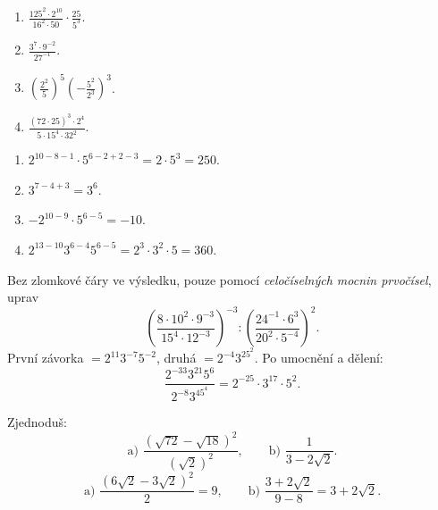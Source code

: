 \documentclass[11pt,a4paper]{article}
\begin{document}
\begin{zadaniReseniBox}[title={Samostatná práce 2},breakable=false]
\begin{enumerate}[label=\alph*)]
\item $\displaystyle\frac{125^2\cdot2^{10}}{16^2\cdot50}\cdot\frac{25}{5^3}$.
\item $\displaystyle\frac{3^7\cdot9^{-2}}{27^{-1}}$.
\item $\displaystyle\left(\frac{2^2}{5}\right)^5\left(-\frac{5^2}{2^3}\right)^3$.
\item $\displaystyle\frac{(72\cdot25)^3\cdot2^4}{5\cdot15^4\cdot32^2}$.
\end{enumerate}
\tcblower
\begin{enumerate}[label=\alph*)]
\item $2^{10-8-1}\cdot5^{6-2+2-3}=2\cdot5^3=\boxed{250}$.
\item $3^{7-4+3}=\boxed{3^6}$.
\item $-2^{10-9}\cdot5^{6-5}=\boxed{-10}$.
\item $2^{13-10}3^{6-4}5^{6-5}=2^3\cdot3^2\cdot5=\boxed{360}$.
\end{enumerate}
\end{zadaniReseniBox}

\begin{zadaniReseniBox}[title={Rozšíření 2},breakable=false]
Bez zlomkové čáry ve výsledku, pouze pomocí \emph{celočíselných mocnin prvočísel},
uprav
\[
\left(\frac{8\cdot10^2\cdot9^{-3}}{15^4\cdot12^{-3}}\right)^{-3}
:\left(\frac{24^{-1}\cdot6^3}{20^2\cdot5^{-4}}\right)^2.
\]
\tcblower
První závorka $=2^{11}3^{-7}5^{-2}$, druhá $=2^{-4}3^25^2$.
Po umocnění a dělení:
\[
\frac{2^{-33}3^{21}5^6}{2^{-8}3^45^4}
=\boxed{2^{-25}\cdot3^{17}\cdot5^2}.
\]
\end{zadaniReseniBox}

\begin{prikladReseniBox}[title={Příklad 3},breakable=false]
Zjednoduš:
\[
\text{a) }\frac{(\sqrt{72}-\sqrt{18})^2}{(\sqrt2)^2},\qquad
\text{b) }\frac1{3-2\sqrt2}.
\]
\tcblower
\[
\text{a) }\frac{(6\sqrt2-3\sqrt2)^2}{2}=\boxed9,
\qquad
\text{b) }\frac{3+2\sqrt2}{9-8}=\boxed{3+2\sqrt2}.
\]
\end{prikladReseniBox}
\end{document}
